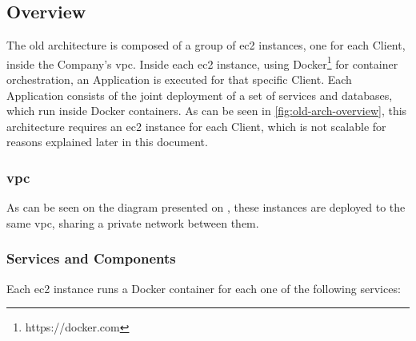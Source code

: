 \subsection{Overview}\label{methodology:ss:overview}

The old architecture is composed of a group of \gls{ec2} instances, one for each Client, inside the Company's \gls{vpc}. Inside each \gls{ec2} instance, using Docker\footnote{https://docker.com}\label{foot:docker} for container orchestration, an Application is executed for that specific Client. Each Application consists of the joint deployment of a set of services and databases, which run inside Docker containers. As can be seen in \cref{fig:old-arch-overview}, this architecture requires an \gls{ec2} instance for each Client, which is not scalable for reasons explained later in this document. 
 

\subsubsection{\gls{vpc}}\label{methodology:sss:vpc}

 As can be seen on the diagram presented on , these instances are deployed to the same \gls{vpc}, sharing a private network between them.

\subsubsection{Services and Components}\label{methodology:sss:services-and-components}





Each \gls{ec2} instance runs a Docker container for each one of the following services:
 
